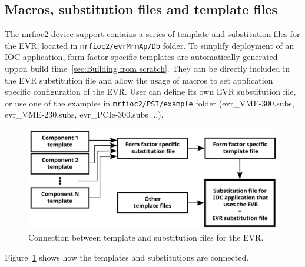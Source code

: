 \documentclass[12pt,a4paper]{article}
\begin{document}


\subsection{Macros, substitution files and template files}\label{sec:Macros}
The mrfioc2 device support contains a series of template and substitution files for the EVR, located in \texttt{mrfioc2/evrMrmAp/Db} folder. To simplify deployment of an IOC application, form factor specific templates are automatically generated uppon build time~\ref{sec:Building from scratch}. They can be directly included in the EVR substitution file and allow the usage of macros to set application specific configuration of the EVR. User can define its own EVR substitution file, or use one of the examples in \texttt{mrfioc2/PSI/example} folder (evr\_VME-300.subs, evr\_VME-230.subs, evr\_PCIe-300.subs ...).
\begin{figure}[H]
	\centering
	\includegraphics[width=\columnwidth]{./img/templates}
	\caption{Connection between template and substitution files for the EVR.}
	\label{fig:templates}
\end{figure}
Figure~\ref{fig:templates} shows how the templates and substitutions are connected.
\end{document}

